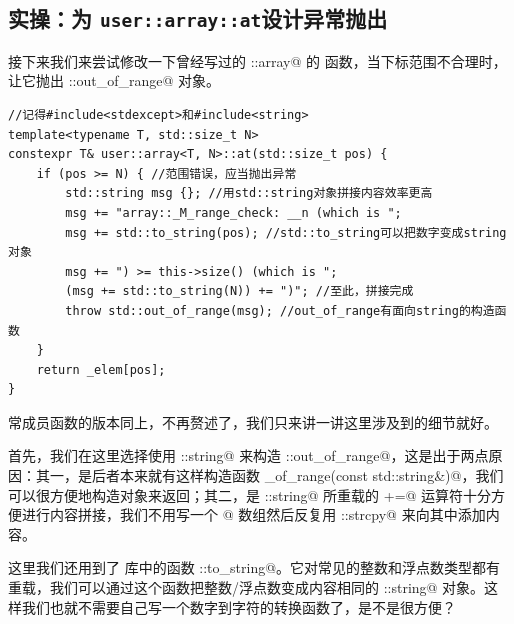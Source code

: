 \subsection*{实操：为 \texttt{user::array::at}设计异常抛出}
接下来我们来尝试修改一下曾经写过的 \lstinline@std::array@ 的 \lstinline@at@ 函数，当下标范围不合理时，让它抛出 \lstinline@std::out_of_range@ 对象。\pagebreak
\begin{lstlisting}
//记得#include<stdexcept>和#include<string>
template<typename T, std::size_t N>
constexpr T& user::array<T, N>::at(std::size_t pos) {
    if (pos >= N) { //范围错误，应当抛出异常
        std::string msg {}; //用std::string对象拼接内容效率更高
        msg += "array::_M_range_check: __n (which is ";
        msg += std::to_string(pos); //std::to_string可以把数字变成string对象
        msg += ") >= this->size() (which is ";
        (msg += std::to_string(N)) += ")"; //至此，拼接完成
        throw std::out_of_range(msg); //out_of_range有面向string的构造函数
    }
    return _elem[pos];
}
\end{lstlisting}
常成员函数的版本同上，不再赘述了，我们只来讲一讲这里涉及到的细节就好。\par
首先，我们在这里选择使用 \lstinline@std::string@ 来构造 \lstinline@std::out_of_range@，这是出于两点原因：其一，是后者本来就有这样构造函数 \lstinline@out_of_range(const std::string&)@，我们可以很方便地构造对象来返回；其二，是 \lstinline@std::string@ 所重载的 \lstinline@+=@ 运算符十分方便进行内容拼接，我们不用写一个 \lstinline@char[]@ 数组然后反复用 \lstinline@std::strcpy@ 来向其中添加内容。\par
这里我们还用到了 \lstinline@string@ 库中的函数 \lstinline@std::to_string@。它对常见的整数和浮点数类型都有重载，我们可以通过这个函数把整数/浮点数变成内容相同的 \lstinline@std::string@ 对象。这样我们也就不需要自己写一个数字到字符的转换函数了，是不是很方便？\par
